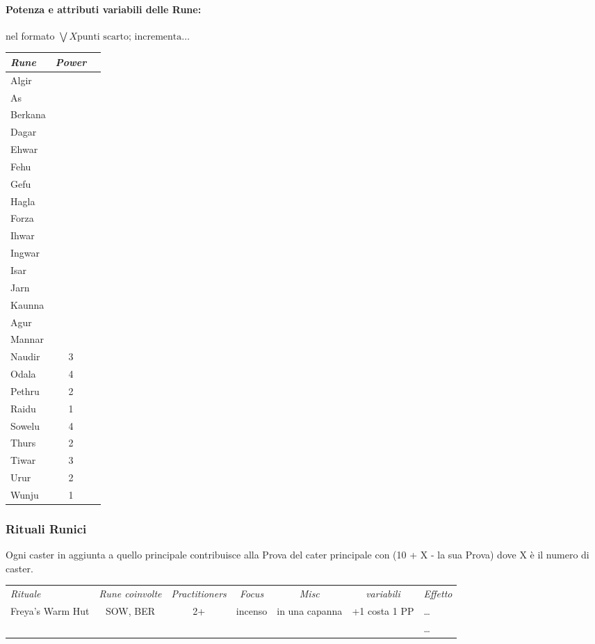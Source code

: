 \documentclass[10pt,a4paper]{article}
\begin{document}
\paragraph{Potenza e attributi variabili delle Rune:}
nel formato $\bigvee X \mbox{punti scarto; incrementa} \ldots$
\begin{tabular}{l || c c}
\hline
\textit{Rune}  & \textit{Power}    \\
\hline
Algir   &      \\
As      &      \\
Berkana &      \\
Dagar   &      \\
Ehwar   &      \\
Fehu    &      \\
Gefu    &      \\
Hagla   &      \\
Forza   &      \\
Ihwar   &      \\
Ingwar  &      \\
Isar    &      \\
Jarn    &      \\
Kaunna  &      \\
Agur    &      \\
Mannar  &      \\
Naudir  &  3    \\
Odala   &  4    \\
Pethru  &  2    \\
Raidu   &  1    \\
Sowelu  &  4    \\
Thurs   &  2    \\
Tiwar   &  3   \\
Urur    &  2    \\
Wunju   &  1    \\
\hline
\end{tabular}

\subsubsection*{Rituali Runici}
Ogni caster in aggiunta a quello principale contribuisce alla Prova del cater principale con (10 + X - la sua Prova) dove X \`{e} il numero di caster.\\
\begin{tabular}{l || c | c | c | c | c || l}
\hline
\textit{Rituale} & \textit{Rune coinvolte}  &  \textit{Practitioners} &  \textit{Focus} &  \textit{Misc} &  \textit{variabili} & \textit{Effetto} \\
Freya's Warm Hut & SOW, BER & 2+ & incenso & in una capanna &  +1 costa 1 PP & \ldots \\
& & &  &  &  & \ldots \\

\hline
\end{tabular}
\end{document}
